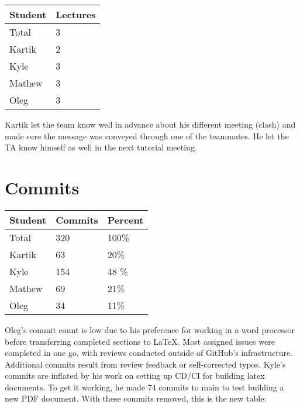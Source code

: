 \documentclass{article}
\begin{document}

\begin{table}[H]
\centering
\begin{tabular}{ll}
\toprule
\textbf{Student} & \textbf{Lectures}\\
\midrule
Total & 3\\
Kartik & 2\\
Kyle   & 3\\
Mathew & 3\\
Oleg   & 3\\
\bottomrule
\end{tabular}
\end{table}

Kartik let the team know well in advance about his different meeting (clash) and made sure the message was conveyed through one of the teammates. He let the TA know himself as well in the next tutorial meeting.

\section{Commits}


\begin{table}[H]
\centering
\begin{tabular}{lll}
\toprule
\textbf{Student} & \textbf{Commits} & \textbf{Percent}\\
\midrule
Total & 320 & 100\% \\
Kartik & 63 & 20\%\\
Kyle   & 154 & 48 \%\\
Mathew & 69 & 21\% \\
Oleg   & 34 & 11\% \\
\bottomrule
\end{tabular}
\end{table}

Oleg's commit count is low due to his preference for working in a word processor before transferring completed sections to LaTeX. Most assigned issues were completed in one go, with reviews conducted outside of GitHub's infrastructure. Additional commits result from review feedback or self-corrected typos.
Kyle's commits are inflated by his work on setting up CD/CI for building latex documents. To get it working, he made 74 commits to main to test building a new PDF document. With these commits removed, this is the new table:\\
\end{document}
